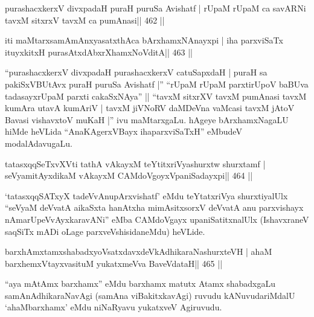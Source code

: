 

\begin{shl}
purashacxkerxV divxpadaH puraH puruSa Avishatf |
rUpaM rUpaM ca savARNi tavxM sitxrxV tavxM ca pumAnasi\hfill || 462 ||
\end{shl}

\begin{shl}
iti maMtarxsamAmAnxyasatxthAca bArxhamxNAnayxpi |
iha parxviSaTx ituyxkitxH purasAtxdAbxrXhamxNoVditA\hfill || 463 ||
\end{shl}

\begin{artha}
``purashacxkerxV divxpadaH purashacxkerxV catuSapxdaH | puraH sa
pakiSxVBUtAvx puraH puruSa Avishatf |'' ``rUpaM rUpaM
parxtirUpoV baBUva tadasayxrUpaM parxti cakaSxNAya'' ||  ``tavxM
sitxrXV tavxM pumAnasi tavxM kumAra utavA kumAriV | tavxM jiVNoRV
daMDeVna vaMcasi tavxM jAtoV Bavasi vishavxtoV muKaH |'' ivu
maMtarxgaLu. hAgeye bArxhamxNagaLU hiMde heVLida ``AnaKAgerxVBayx
ihaparxviSaTxH'' eMbudeV modalAdavugaLu.
\end{artha}

\begin{shl}
tatasxqqSeTxvXVti tathA vAkayxM teYtitxriVyashurxtw shurxtamf |
seVyamitAyxdikaM vAkayxM CAMdoVgoyxVpaniSadayxpi\hfill || 464 ||
\end{shl}

\begin{artha}
`tatasxqqSATxyX tadeVvAnupArxvishatf' eMdu teYtatxriVya shurxtiyalUlx
``seVyaM deVvatA aikaSxta hanAtxha mimAsitxsorxV deVvatA anu
parxvishayx nAmarUpeV\break vAyxkaravANi'' eMba CAMdoVgayx
upaniSatitxnalUlx (IshavxraneV saqSiTx mADi oLage
parxveVshisidaneMdu) heVLide.
\end{artha}



\begin{shl}
barxhAmxtamxshabadxyoVsatxdavxdeVkAdhikaraNashurxteVH |
ahaM barxhemxVtayxvasituM yukatxmeVva BaveVdataH\hfill || 465 ||
\end{shl}

\begin{artha}
``aya mAtAmx barxhamx'' eMdu barxhamx matutx Atamx shabadxgaLu samAnAdhikaraNavAgi (samAna viBakitxkavAgi) ruvudu kANuvudariMdalU `ahaMbarxhamx' eMdu niNaRyavu yukatxveV Agiruvudu.
\end{artha}




